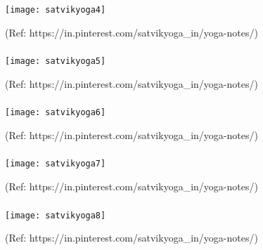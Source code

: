 \begin{frame}[fragile]\frametitle{}

\begin{center}
\texttt{[image: satvikyoga4]}

{\tiny (Ref: https://in.pinterest.com/satvikyoga\_in/yoga-notes/)}
\end{center}

\end{frame}

\begin{frame}[fragile]\frametitle{}

\begin{center}
\texttt{[image: satvikyoga5]}

{\tiny (Ref: https://in.pinterest.com/satvikyoga\_in/yoga-notes/)}
\end{center}

\end{frame}

\begin{frame}[fragile]\frametitle{}

\begin{center}
\texttt{[image: satvikyoga6]}

{\tiny (Ref: https://in.pinterest.com/satvikyoga\_in/yoga-notes/)}
\end{center}

\end{frame}%
\begin{frame}[fragile]\frametitle{}

\begin{center}
\texttt{[image: satvikyoga7]}

{\tiny (Ref: https://in.pinterest.com/satvikyoga\_in/yoga-notes/)}
\end{center}

\end{frame}

\begin{frame}[fragile]\frametitle{}

\begin{center}
\texttt{[image: satvikyoga8]}

{\tiny (Ref: https://in.pinterest.com/satvikyoga\_in/yoga-notes/)}
\end{center}

\end{frame}

